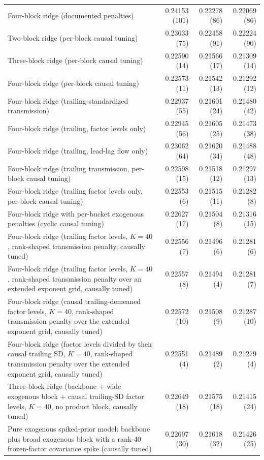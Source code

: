 \begin{longtable}{p{}rrr}
Four-block ridge (documented penalties) & 0.24153 (101) & 0.22278 (86) & 0.22069 (86) \\
Two-block ridge (per-block causal tuning) & 0.23633 (75) & 0.22458 (91) & 0.22224 (90) \\
Three-block ridge (per-block causal tuning) & 0.22590 (14) & 0.21566 (17) & 0.21309 (14) \\
Four-block ridge (per-block causal tuning) & 0.22573 (11) & 0.21542 (13) & 0.21292 (12) \\
Four-block ridge (trailing-standardized transmission) & 0.22937 (55) & 0.21601 (24) & 0.21480 (42) \\
Four-block ridge (trailing, factor levels only) & 0.22945 (56) & 0.21605 (25) & 0.21473 (38) \\
Four-block ridge (trailing, lead-lag flow only) & 0.23062 (64) & 0.21620 (34) & 0.21488 (48) \\
Four-block ridge (trailing transmission, per-block causal tuning) & 0.22598 (15) & 0.21518 (12) & 0.21297 (13) \\
Four-block ridge (trailing factor levels only, per-block causal tuning) & 0.22553 (6) & 0.21515 (11) & 0.21282 (8) \\
Four-block ridge with per-bucket exogenous penalties (cyclic causal tuning) & 0.22627 (17) & 0.21504 (8) & 0.21316 (15) \\
Four-block ridge (trailing factor levels, $K=40$, rank-shaped transmission penalty, causally tuned) & 0.22556 (7) & 0.21496 (6) & 0.21281 (6) \\
Four-block ridge (trailing factor levels, $K=40$, rank-shaped transmission penalty over an extended exponent grid, causally tuned) & 0.22557 (8) & 0.21494 (4) & 0.21281 (7) \\
Four-block ridge (causal trailing-demeaned factor levels, $K=40$, rank-shaped transmission penalty over the extended exponent grid, causally tuned) & 0.22572 (10) & 0.21508 (9) & 0.21287 (10) \\
Four-block ridge (factor levels divided by their causal trailing SD, $K=40$, rank-shaped transmission penalty over the extended exponent grid, causally tuned) & 0.22551 (4) & 0.21489 (2) & 0.21279 (4) \\
Three-block ridge (backbone + wide exogenous block + causal trailing-SD factor levels, $K=40$, no product block, causally tuned) & 0.22649 (18) & 0.21575 (18) & 0.21415 (24) \\
Pure exogenous spiked-prior model: backbone plus broad exogenous block with a rank-40 frozen-factor covariance spike (causally tuned) & 0.22697 (30) & 0.21618 (32) & 0.21426 (25) \\

\end{longtable}
